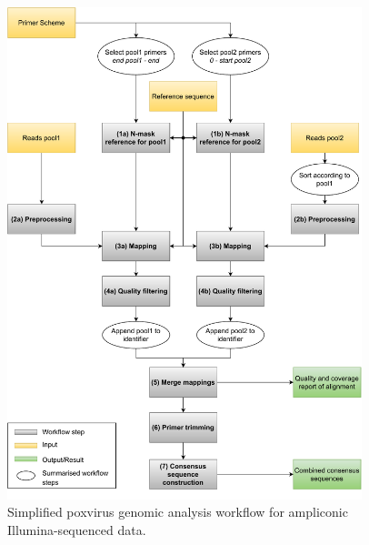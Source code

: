 \begin{figure}[ht!]
	\includegraphics[width=0.92\textwidth]{media/3-pox.pdf}
	\caption{Simplified poxvirus genomic analysis workflow for ampliconic Illumina-sequenced data.}
	\label{fig:3-pox-wf}
\end{figure}

